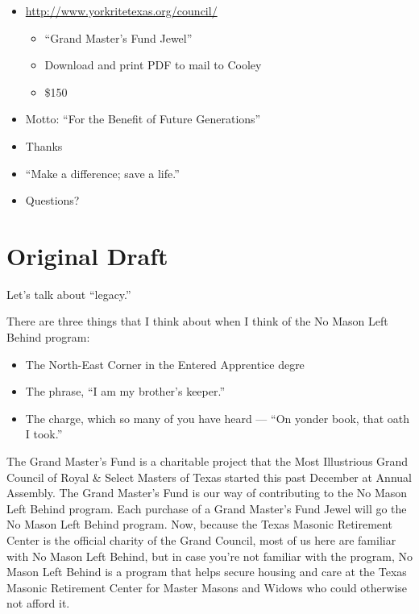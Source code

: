 \documentclass{article}
\begin{document}
\begin{itemize}
\begin{itemize}
			\end{itemize}
			\item \url{http://www.yorkritetexas.org/council/}
				\begin{itemize}
					\item ``Grand Master's Fund Jewel''
					\item Download and print PDF to mail to Cooley
					\item \$150
				\end{itemize}	
			\item Motto: ``For the Benefit of Future Generations''
			\item Thanks
			\item ``Make a difference; save a life.''
			\item Questions?
		\end{itemize}
	
	\pagebreak
	
	\section*{Original Draft}
	
	Let's talk about ``legacy.''
	
	There are three things that I think about when I think of the No Mason Left Behind program:
	
	\begin{itemize}
		\item The North-East Corner in the Entered Apprentice degre
		\item The phrase, ``I am my brother's keeper.''
		\item The charge, which so many of you have heard --- ``On yonder book, that oath I took.''
	\end{itemize}

	The Grand Master's Fund is a charitable project that the Most Illustrious Grand Council of Royal \& Select Masters of Texas started this past December at Annual Assembly. The Grand Master's Fund is our way of contributing to the No Mason Left Behind program. Each purchase of a Grand Master's Fund Jewel will go the No Mason Left Behind program. Now, because the Texas Masonic Retirement Center is the official charity of the Grand Council, most of us here are familiar with No Mason Left Behind, but in case you're not familiar with the program, No Mason Left Behind is a program that helps secure housing and care at the Texas Masonic Retirement Center for Master Masons and Widows who could otherwise not afford it.
	
\end{document}
